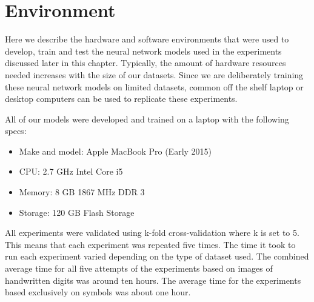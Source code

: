 \section{Environment} \label{sec:empirical-studies-environment}

Here we describe the hardware and software environments that were used to develop, train and test the neural network models used in the experiments discussed later in this chapter. Typically, the amount of hardware resources needed increases with the size of our datasets\cite{Bengio07scalinglearning}. Since we are deliberately training these neural network models on limited datasets, common off the shelf laptop or desktop computers can be used to replicate these experiments.

All of our models were developed and trained on a laptop with the following specs:
\begin{itemize}
	\item Make and model: Apple MacBook Pro (Early 2015)
	\item CPU: 2.7 GHz Intel Core i5
	\item Memory: 8 GB 1867 MHz DDR 3
	\item Storage: 120 GB Flash Storage
\end{itemize}	
All experiments were validated using k-fold cross-validation where k is set to 5. This means that each experiment was repeated five times. The time it took to run each experiment varied depending on the type of dataset used. The combined average time for all five attempts of the experiments based on images of handwritten digits was around ten hours. The average time for the experiments based exclusively on symbols was about one hour.

